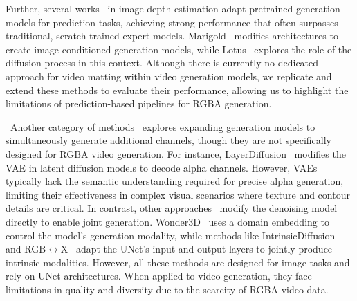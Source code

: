 Further, several works~\cite{he2024lotus, yang2024depth, ke2024repurposing} in image depth estimation adapt pretrained generation models for prediction tasks, achieving strong performance that often surpasses traditional, scratch-trained expert models. Marigold~\cite{ke2024repurposing} modifies architectures to create image-conditioned generation models, while Lotus~\cite{he2024lotus} explores the role of the diffusion process in this context. Although there is currently no dedicated approach for video matting within video generation models, we replicate and extend these methods to evaluate their performance, allowing us to highlight the limitations of prediction-based pipelines for RGBA generation.

\vspace{0.5em}
~Another category of methods~\cite{zhang2024transparent, long2024wonder3d, bao2023one, luo2024intrinsicdiffusion, zeng2024rgb, he2024lucidfusion, yang2023defect} explores expanding generation models to simultaneously generate additional channels, though they are not specifically designed for RGBA video generation. 
For instance, LayerDiffusion~\cite{zhang2024transparent} modifies the VAE in latent diffusion models to decode alpha channels. However, VAEs typically lack the semantic understanding required for precise alpha generation, limiting their effectiveness in complex visual scenarios where texture and contour details are critical. 
In contrast, other approaches~\cite{long2024wonder3d, bao2023one, luo2024intrinsicdiffusion, zeng2024rgb} modify the denoising model directly to enable joint generation. Wonder3D~\cite{long2024wonder3d} uses a domain embedding to control the model’s generation modality, while methods like IntrinsicDiffusion~\cite{luo2024intrinsicdiffusion} and RGB\(\leftrightarrow\)X~\cite{zeng2024rgb} adapt the UNet’s input and output layers to jointly produce intrinsic modalities. However, all these methods are designed for image tasks and rely on UNet architectures. When applied to video generation, they face limitations in quality and diversity due to the scarcity of RGBA video data.
